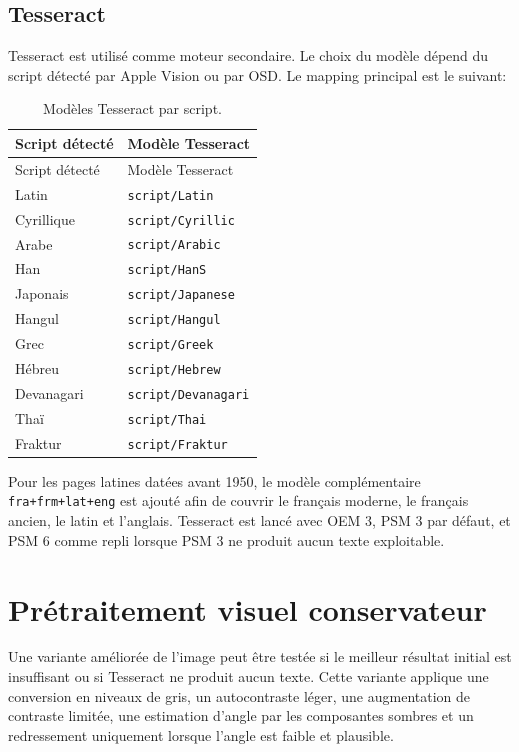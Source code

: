 \documentclass[11pt,a4paper]{article}
\begin{document}
\subsection{Tesseract}

Tesseract est utilisé comme moteur secondaire. Le choix du modèle dépend du script détecté par Apple Vision ou par OSD. Le mapping principal est le suivant:

\begin{longtable}{ll}
\caption{Modèles Tesseract par script.}\\
\toprule
Script détecté & Modèle Tesseract \\
\midrule
\endfirsthead
\toprule
Script détecté & Modèle Tesseract \\
\midrule
\endhead
Latin & \texttt{script/Latin} \\
Cyrillique & \texttt{script/Cyrillic} \\
Arabe & \texttt{script/Arabic} \\
Han & \texttt{script/HanS} \\
Japonais & \texttt{script/Japanese} \\
Hangul & \texttt{script/Hangul} \\
Grec & \texttt{script/Greek} \\
Hébreu & \texttt{script/Hebrew} \\
Devanagari & \texttt{script/Devanagari} \\
Thaï & \texttt{script/Thai} \\
Fraktur & \texttt{script/Fraktur} \\
\bottomrule
\end{longtable}

Pour les pages latines datées avant 1950, le modèle complémentaire \texttt{fra+frm+lat+eng} est ajouté afin de couvrir le français moderne, le français ancien, le latin et l'anglais. Tesseract est lancé avec OEM 3, PSM 3 par défaut, et PSM 6 comme repli lorsque PSM 3 ne produit aucun texte exploitable.

\section{Prétraitement visuel conservateur}

Une variante améliorée de l'image peut être testée si le meilleur résultat initial est insuffisant ou si Tesseract ne produit aucun texte. Cette variante applique une conversion en niveaux de gris, un autocontraste léger, une augmentation de contraste limitée, une estimation d'angle par les composantes sombres et un redressement uniquement lorsque l'angle est faible et plausible.
\end{document}
